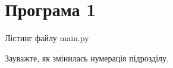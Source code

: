 \label{appendix:A}

\section{Програма 1}

Лістинг файлу main.py





Зауважте, як змінилась нумерація підрозділу.